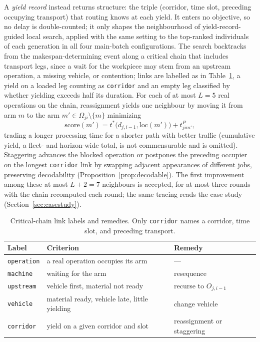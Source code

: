 A \emph{yield record} instead returns structure: the triple (corridor, time slot, preceding occupying transport) that routing knows at each yield.
It enters no objective, so no delay is double-counted; it only shapes the neighbourhood of yield-record-guided local search, applied with the same setting to the top-ranked individuals of each generation in all four main-batch configurations.
The search backtracks from the makespan-determining event along a critical chain that includes transport legs, since a wait for the workpiece may stem from an upstream operation, a missing vehicle, or contention; links are labelled as in Table~\ref{tab:attrib}, a yield on a loaded leg counting as \texttt{corridor} and an empty leg classified by whether yielding exceeds half its duration.
For each of at most $L=5$ real operations on the chain, reassignment yields one neighbour by moving it from arm $m$ to the arm $m'\in\Omega_{ji}\setminus\{m\}$ minimizing
\begin{equation}
\label{eq:reassign}
\mathrm{score}(m')=t^{*}\bigl(d_{j,i-1},\mathrm{loc}(m')\bigr)+t^{P}_{jim'},
\end{equation}
trading a longer processing time for a shorter path with better traffic (cumulative yield, a fleet- and horizon-wide total, is not commensurable and is omitted).
Staggering advances the blocked operation or postpones the preceding occupier on the longest \texttt{corridor} link by swapping adjacent appearances of different jobs, preserving decodability (Proposition~\ref{prop:decodable}).
The first improvement among these at most $L+2=7$ neighbours is accepted, for at most three rounds with the chain recomputed each round; the same tracing reads the case study (Section~\ref{sec:casestudy}).

\begin{table}[t]
\caption{Critical-chain link labels and remedies. Only \texttt{corridor} names a corridor, time slot, and preceding transport.}
\label{tab:attrib}
\footnotesize
\begin{tabular}{@{}llp{2.3cm}@{}}
\toprule
Label & Criterion & Remedy \\
\midrule
\texttt{operation} & a real operation occupies its arm & --- \\
\texttt{machine} & waiting for the arm & resequence \\
\texttt{upstream} & vehicle first, material not ready & recurse to $O_{j,i-1}$ \\
\texttt{vehicle} & material ready, vehicle late, little yielding & change vehicle \\
\texttt{corridor} & yield on a given corridor and slot & reassignment or staggering \\
\bottomrule
\end{tabular}
\end{table}

